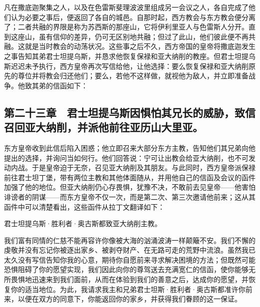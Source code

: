 凡在撒底迦聚集之人，以及在色雷斯斐理波波里组成另一会议之人，各自完成了他们认为必要之事后，便返回了各自的城邑。自那时起，西方教会与东方教会便分离了；二者共融的界限是称为苏西斯的那座山，它将伊利里亚人与色雷斯人分开。直到这座山，虽有信仰的差异，仍可无区别地共融；但过了此山，他们彼此便不再共融。这就是当时教会的动荡状况。这些事之后不久，西方帝国的皇帝将撒底迦发生之事告知其弟君士坦提乌斯，并恳求他恢复保禄和亚大纳削的教座。但君士坦提乌斯迟迟未予执行，西方皇帝再次写信给他，让他选择：要么恢复保禄和亚大纳削原先的尊位并将教会归还他们；要么，若他不这样做，就视他为敌人，并立即准备战争。他致其弟的信函如下：\par

\par


\subsection{第二十三章　君士坦提乌斯因惧怕其兄长的威胁，致信召回亚大纳削，并派他前往亚历山大里亚。}

东方皇帝收到此信后陷入困惑；他立即召来大部分东方主教，告知他们其兄弟向他提出的选择，并询问当如何行。他们回答说：宁可让出教会给亚大纳削，也不可发动内战。于是皇帝迫于无奈，召见亚大纳削及其朋友。与此同时，西方皇帝派保禄前往君士坦丁堡，带有两位主教和其他体面随从，并用他自己的信函及会议的函件加强了他的地位。但亚大纳削仍心存畏惧，犹豫不决，不敢前去见皇帝——他害怕诽谤者的阴谋——而东方皇帝不仅一次，而是第二次、第三次邀请他前来；这从其函件中可以清楚看出，这些函件从拉丁文翻译如下：\par

\par

君士坦提乌斯·胜利者·奥古斯都致亚大纳削主教。\par

我们富有同情的仁慈不能再容许你像被大海的汹涌波涛一样颠簸不安。我们不懈的虔敬并没有忘记你被逐出家乡、被剥夺财产、在无路可走的荒野中流浪。虽然我已太久没有写信告知你我的心意，期待你自愿前来寻求解决困境的方法；但既然可能恐惧阻碍了你的愿望实现，我们因此向你的尊驾送去充满宽仁的信函，使你能够无所畏惧地迅速来到我们面前，从而在体验到我们的善意之后，达成你的愿望，并恢复你的适当地位。为此，我请求我主和兄弟君士坦斯·胜利者·奥古斯都准许你前来，以便在双方的同意下，你能返回你的家乡，并获得我们眷顾的这一保证。\par

